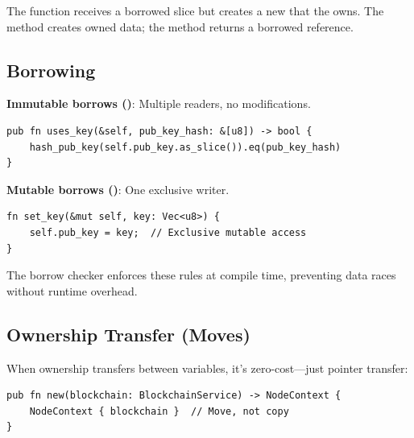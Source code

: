 The  function receives a borrowed slice but creates a new  that the  owns. The  method creates owned data; the  method returns a borrowed reference.

\subsection{Borrowing}
\label{subsec:ch24-borrowing}

\textbf{Immutable borrows ()}: Multiple readers, no modifications.

\begin{listing}[H]
\caption{Immutable borrowing}
\label{lst:ch24-borrow-immut}
\begin{verbatim}
pub fn uses_key(&self, pub_key_hash: &[u8]) -> bool {
    hash_pub_key(self.pub_key.as_slice()).eq(pub_key_hash)
}
\end{verbatim}
\end{listing}

\textbf{Mutable borrows ()}: One exclusive writer.

\begin{listing}[H]
\caption{Mutable borrowing}
\label{lst:ch24-borrow-mut}
\begin{verbatim}
fn set_key(&mut self, key: Vec<u8>) {
    self.pub_key = key;  // Exclusive mutable access
}
\end{verbatim}
\end{listing}

The borrow checker enforces these rules at compile time, preventing data races without runtime overhead.

\subsection{Ownership Transfer (Moves)}
\label{subsec:ch24-moves}

When ownership transfers between variables, it's zero-cost---just pointer transfer:

\begin{listing}[htbp]
\caption{Ownership move}
\label{lst:ch24-moves}
\begin{verbatim}
pub fn new(blockchain: BlockchainService) -> NodeContext {
    NodeContext { blockchain }  // Move, not copy
}
\end{verbatim}
\end{listing}

